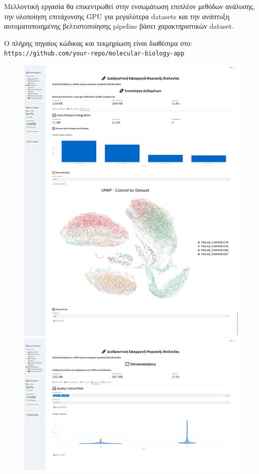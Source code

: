 \documentclass[11pt,a4paper]{article}
\begin{document}
Μελλοντική εργασία θα επικεντρωθεί στην ενσωμάτωση επιπλέον μεθόδων ανάλυσης, την υλοποίηση επιτάχυνσης GPU για μεγαλύτερα datasets και την ανάπτυξη αυτοματοποιημένης βελτιστοποίησης pipeline βάσει χαρακτηριστικών dataset.

Ο πλήρης πηγαίος κώδικας και τεκμηρίωση είναι διαθέσιμα στο: \texttt{https://github.com/your-repo/molecular-biology-app}

\begin{figure}[H]
    \centering
    \includegraphics[width=1.0\linewidth]{graph_unified.png}
    \includegraphics[width=1.0\linewidth]{violin_plots.png}

\end{figure}
\end{document}
